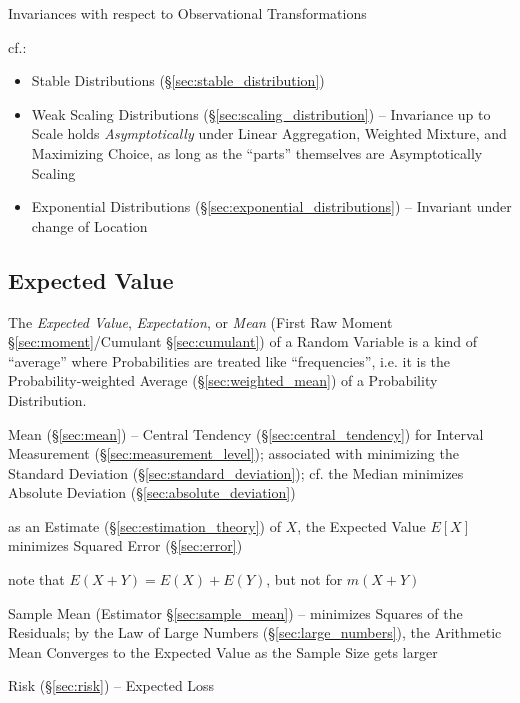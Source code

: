 Invariances with respect to Observational Transformations

cf.:
\begin{itemize}
  \item Stable Distributions (\S\ref{sec:stable_distribution})
  \item Weak Scaling Distributions (\S\ref{sec:scaling_distribution}) --
    Invariance up to Scale holds \emph{Asymptotically} under Linear Aggregation,
    Weighted Mixture, and Maximizing Choice, as long as the ``parts'' themselves
    are Asymptotically Scaling
  \item Exponential Distributions (\S\ref{sec:exponential_distributions}) --
    Invariant under change of Location
\end{itemize}



\subsection{Expected Value}\label{sec:expected_value}

The \emph{Expected Value}, \emph{Expectation}, or \emph{Mean} (First Raw Moment
\S\ref{sec:moment}/Cumulant \S\ref{sec:cumulant}) of a Random Variable is a kind
of ``average'' where Probabilities are treated like ``frequencies'', i.e. it is
the Probability-weighted Average (\S\ref{sec:weighted_mean}) of a Probability
Distribution.

\fist Mean (\S\ref{sec:mean}) -- Central Tendency (\S\ref{sec:central_tendency})
for Interval Measurement (\S\ref{sec:measurement_level}); associated with
minimizing the Standard Deviation (\S\ref{sec:standard_deviation}); cf. the
Median minimizes Absolute Deviation (\S\ref{sec:absolute_deviation})

as an Estimate (\S\ref{sec:estimation_theory}) of $X$, the Expected Value $E[X]$
minimizes Squared Error (\S\ref{sec:error})

note that $E(X + Y) = E(X) + E(Y)$, but not for $m(X+Y)$

\fist Sample Mean (Estimator \S\ref{sec:sample_mean}) -- minimizes Squares of
the Residuals;
by the Law of Large Numbers (\S\ref{sec:large_numbers}), the Arithmetic Mean
Converges to the Expected Value as the Sample Size gets larger

\fist Risk (\S\ref{sec:risk}) -- Expected Loss

